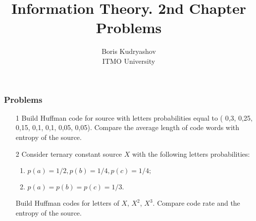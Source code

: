 \documentclass[14pt]{beamer}
\title{\small{Information Theory. 2nd Chapter Problems}}
\author{\huge{
Boris Kudryashov \\
\vspace{30pt}
ITMO University
}}
\begin{document}
\maketitle

\begin{frame}
\frametitle{Problems}
\begin{enumerate}
  \item[1] Build Huffman code for source with letters probabilities equal to ( 0,3, 0,25, 0,15, 0,1, 0,1, 0,05, 0,05). Compare the average length of code words with entropy of the source.
  \pause \item[2] Consider ternary constant source $X$  with the following letters probabilities: 
    \begin{enumerate}
    \item
    $p\left( a \right) = 1/2,p\left( b\right) = 1/4,p\left(c\right)=1/4;$
    \item
    $p\left( a \right) = p\left( b \right) = p\left( c \right) = 1 / 3.$
    \end{enumerate}
  Build Huffman codes for letters of $X$, $X^{2}$, $X^{3}$. Compare code rate and the entropy of the source.
\end{enumerate}
\end{frame}
\end{document}
